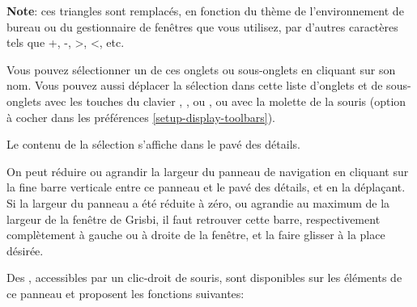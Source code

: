 
\textbf{Note}: ces triangles sont remplacés, en fonction du thème de l'environnement de bureau ou du gestionnaire de fenêtres que vous utilisez, par d'autres caractères tels que +, -, >, <, etc.

Vous pouvez sélectionner un de ces onglets ou sous-onglets en cliquant sur son nom. Vous pouvez aussi déplacer la sélection dans cette liste d'onglets et de sous-onglets avec les touches du clavier , ,  ou , ou avec la molette de la souris (option à cocher dans les préférences \vref{setup-display-toolbars}). 


Le contenu de la sélection s'affiche dans le pavé des détails. 

On peut réduire ou agrandir la largeur du panneau de navigation en cliquant sur la fine barre verticale entre ce panneau et le pavé des détails, et en la déplaçant. Si la largeur du panneau a été réduite à zéro, ou agrandie au maximum de la largeur de la fenêtre de Grisbi, il faut retrouver cette barre, respectivement complètement à gauche ou à droite de la fenêtre, et la faire glisser à la place désirée. 

Des , accessibles par un clic-droit de souris, sont disponibles sur les éléments de ce panneau et proposent les fonctions suivantes:

